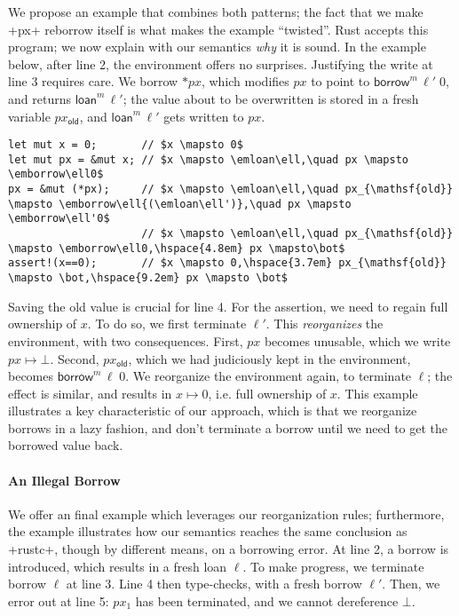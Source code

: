 \documentclass[acmsmall,screen]{acmart}
\newif\iflong
\newcommand\emborrow[2]{\ensuremath{\mathsf{borrow}^m\,#1\;#2}}
\newcommand\emloan[1]{\ensuremath{\mathsf{loan}^m\,#1}}
\newcommand\myparagraph[1]{\emph{#1}.\ }
\let\myparagraph\paragraph
\begin{document}
We propose an example that combines both patterns; the fact that we make
\li+px+ reborrow itself is what makes the example ``twisted''. Rust accepts this
program; we now explain with our semantics \emph{why} it is sound.
In the example below, after line
2, the environment offers no surprises. Justifying the write at line 3 requires
care. We borrow $*px$, which modifies $px$ to point to $\emborrow{\ell'}0$,
and returns $\emloan{\ell'}$; the value about to be overwritten is stored in a
fresh variable $px_\mathsf{old}$, and $\emloan\ell'$
gets written to $px$.
\begin{verbatim}
let mut x = 0;       // $x \mapsto 0$
let mut px = &mut x; // $x \mapsto \emloan\ell,\quad px \mapsto \emborrow\ell0$
px = &mut (*px);     // $x \mapsto \emloan\ell,\quad px_{\mathsf{old}} \mapsto \emborrow\ell{(\emloan\ell')},\quad px \mapsto \emborrow\ell'0$
                     // $x \mapsto \emloan\ell,\quad px_{\mathsf{old}} \mapsto \emborrow\ell0,\hspace{4.8em} px \mapsto\bot$
assert!(x==0);       // $x \mapsto 0,\hspace{3.7em} px_{\mathsf{old}} \mapsto \bot,\hspace{9.2em} px \mapsto \bot$
\end{verbatim}
Saving the old value is crucial for line 4.
For the assertion, we need to regain full ownership of $x$. To do so,
we first terminate $\ell'$.
This \emph{reorganizes} the environment, with two consequences.
First, $px$ becomes unusable, which we write $px \mapsto
\bot$. Second, $px_\mathsf{old}$, which we had judiciously kept in the
environment, becomes $\emborrow\ell0$. We reorganize the environment again, to
terminate $\ell$; the effect is similar, and results in $x \mapsto
0$, i.e. full ownership of $x$.
This example illustrates a key characteristic of our approach, which is that we
reorganize borrows in a lazy fashion, and don't terminate a borrow until we
need to get the borrowed value back.

\iflong
\myparagraph{An Illegal Borrow}
We offer an final example which leverages our reorganization rules;
furthermore, the example illustrates how our semantics reaches the same
conclusion as \li+rustc+, though by different means, on a borrowing error.
At line 2, a borrow is introduced, which results in a fresh loan $\ell$.
To make progress, we
terminate borrow $\ell$ at line 3.
Line 4 then type-checks, with a fresh borrow $\ell'$. Then, we error
out at line 5: $px_1$ has been terminated, and we cannot dereference $\bot$.
\end{document}
